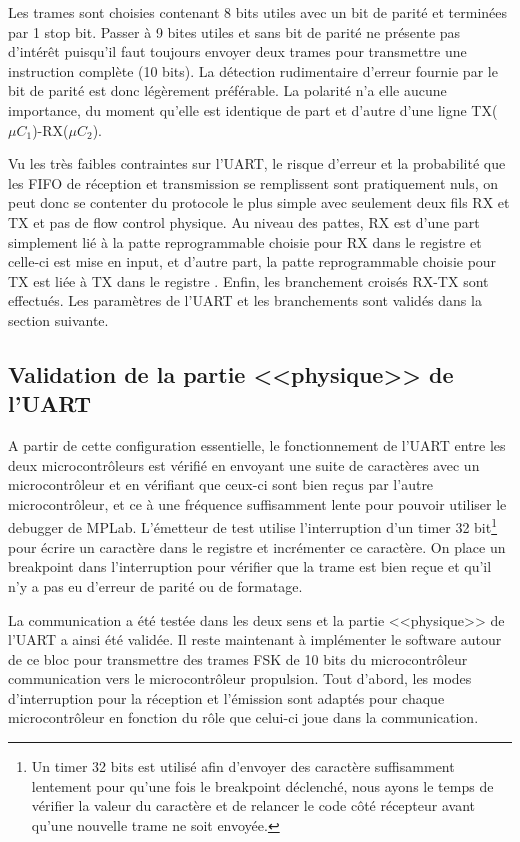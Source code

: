 Les trames sont choisies contenant 8 bits utiles avec un bit de parité et terminées par 1 stop bit. Passer à 9 bites utiles et sans bit de parité ne présente pas d'intérêt puisqu'il faut toujours envoyer deux trames pour transmettre une instruction complète (10 bits). La détection rudimentaire d'erreur fournie par le bit de parité est donc légèrement préférable. La polarité n'a elle aucune importance, du moment qu'elle est identique de part et d'autre d'une ligne TX($\mu C_1$)-RX($\mu C_2$).

Vu les très faibles contraintes sur l'UART, le risque d'erreur et la probabilité que les FIFO de réception et transmission se remplissent sont pratiquement nuls, on peut donc se contenter du protocole le plus simple avec seulement deux fils RX et TX et pas de flow control physique. Au niveau des pattes, RX est d'une part simplement lié à la patte reprogrammable choisie pour RX dans le registre  et celle-ci est mise en input, et d'autre part, la patte reprogrammable choisie pour TX est liée à TX dans le registre . Enfin, les branchement croisés RX-TX sont effectués. Les paramètres de l'UART et les branchements sont validés dans la section suivante.

\subsection{Validation de la partie <<physique>> de l'UART\label{sec:validUart}}
A partir de cette configuration essentielle, le fonctionnement de l'UART entre les deux microcontrôleurs est vérifié en envoyant une suite de caractères avec un microcontrôleur et en vérifiant que ceux-ci sont bien reçus par l'autre microcontrôleur, et ce à une fréquence suffisamment lente pour pouvoir utiliser le debugger de MPLab. L'émetteur de test utilise l'interruption d'un timer 32 bit\footnote{Un timer 32 bits est utilisé afin d'envoyer des caractère suffisamment lentement pour qu'une fois le breakpoint déclenché, nous ayons le temps de vérifier la valeur du caractère et de relancer le code côté récepteur avant qu'une nouvelle trame ne soit envoyée.} pour écrire un caractère dans le registre  et incrémenter ce caractère. On place un breakpoint dans l'interruption  pour vérifier que la trame est bien reçue et qu'il n'y a pas eu d'erreur de parité ou de formatage.

La communication a été testée dans les deux sens et la partie <<physique>> de l'UART a ainsi été validée. Il reste maintenant à implémenter le software autour de ce bloc pour transmettre des trames FSK de 10 bits du microcontrôleur communication vers le microcontrôleur propulsion. Tout d'abord, les modes d'interruption pour la réception et l'émission sont adaptés pour chaque microcontrôleur en fonction du rôle que celui-ci joue dans la communication.

